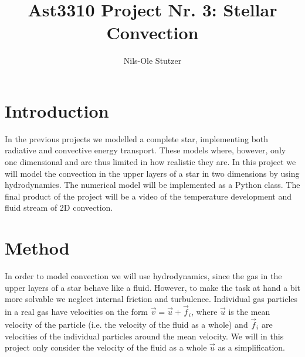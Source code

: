 \documentclass{emulateapj}
\begin{document}
	
	\title{Ast3310 Project Nr. 3: Stellar Convection}
	
	\author{Nils-Ole Stutzer}
	
	
	\section*{Introduction}
	In the previous projects we modelled a complete star, implementing both radiative and convective energy transport. These models where, however, only one dimensional and are thus limited in how realistic they are. In this project we will model the convection in the upper layers of a star in two dimensions by using hydrodynamics. The numerical model will be implemented as a Python class. The final product of the project will be a video of the temperature development and fluid stream of 2D convection.
	
	\section*{Method}
	In order to model convection we will use hydrodynamics, since the gas in the upper layers of a star behave like a fluid. However, to make the task at hand a bit more solvable we neglect internal friction and turbulence. Individual gas particles in a real gas have velocities on the form $\vec{v} = \vec{u} + \vec{f}_i$, where $\vec{u}$ is the mean velocity of the particle (i.e. the velocity of the fluid as a whole) and $\vec{f}_i$ are velocities of the individual particles around the mean velocity. We will in this project only consider the velocity of the fluid as a whole $\vec{u}$ as a simplification. 
	
\end{document}
